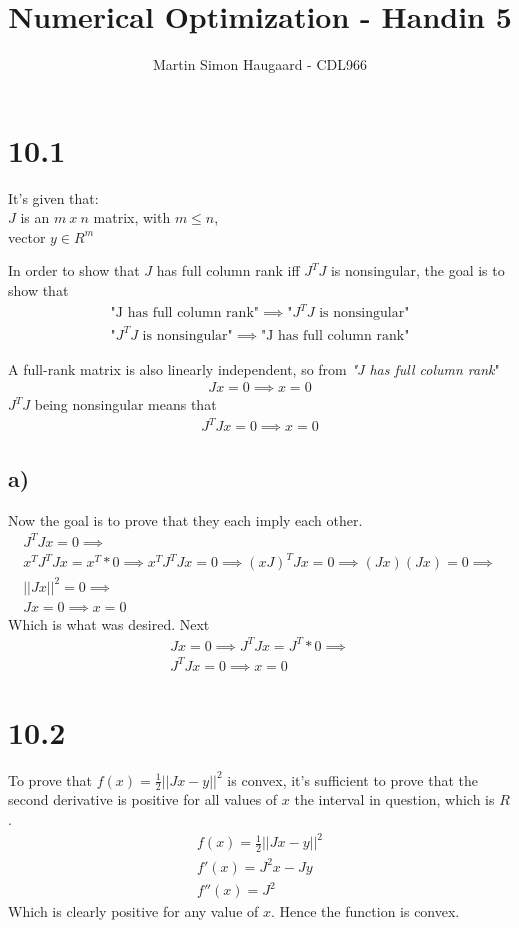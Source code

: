 \documentclass[11pt]{article} %
\title{Numerical Optimization - Handin 5}
\author{Martin Simon Haugaard - CDL966}
\begin{document}
\maketitle
\section*{10.1}
It's given that: \\
$J$ is an $m~x ~n$ matrix, with $m \leq n$,\\
vector $y \in R^m$\

In order to show that $J$ has full column rank iff $J^T J$ is nonsingular, the goal is to show that
\begin{gather*}\text{"J has full column rank"}\implies\text{"$J^T J$ is nonsingular"}\\
\text{"$J^T J$ is nonsingular"}\implies\text{"J has full column rank"} \end{gather*}

A full-rank matrix is also linearly independent, so from \textit{"J has full column rank}" \begin{gather}J  x = 0 \implies x = 0\end{gather}
$J^T J$ being nonsingular means that
\begin{gather}
J^T J x= 0 \implies x = 0
\end{gather}
\subsection*{\textbf{a)}}
Now the goal is to prove that they each imply each other.
\begin{gather*}
J^T J x= 0 \implies \\
x^T J^T J x = x^T * 0 \implies x^T J^T J x = 0  \implies (x J)^T J x  = 0\implies (J x)  (J x)  = 0\implies\\ || J x|| ^2  = 0\implies\\ J x = 0 \implies x = 0
\end{gather*}
Which is what was desired. Next 
\begin{gather*}
Jx = 0 \implies J^T Jx = J^T * 0 \implies \\J^T Jx = 0 \implies x = 0
\end{gather*}
\section*{10.2}
To prove that $f(x) = \frac{1}{2} || Jx - y || ^2$ is convex, it's sufficient to prove that the second derivative is positive for all values of $x$ the interval in question, which is $R$.
\begin{gather*}
f(x) = \frac{1}{2} || Jx - y || ^2\\
f'(x) = J^2 x - Jy\\
f''(x) = J^2
\end{gather*}
Which is clearly positive for any value of $x$. Hence the function is convex.
\end{document}
